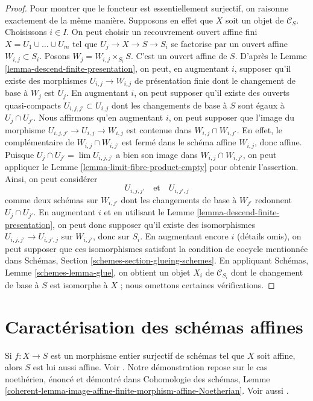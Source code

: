 \begin{proof}
\medskip\noindent
Pour montrer que le foncteur est essentiellement surjectif, on raisonne
exactement de la même manière. Supposons en effet que
$X$ soit un objet de $\mathcal{C}_S$. Choisissons $i \in I$.
On peut choisir un recouvrement ouvert affine fini
$X = U_1 \cup \ldots \cup U_m$ tel que $U_j \to X \to S \to S_i$
se factorise par un ouvert affine $W_{i, j} \subset S_i$.
Posons $W_j = W_{i, j} \times_{S_i} S$. C'est un ouvert affine de $S$.
D'après le Lemme \ref{lemma-descend-finite-presentation},
on peut, en augmentant $i$, supposer qu'il existe des morphismes
$U_{i, j} \to W_{i, j}$ de présentation finie
dont le changement de base à $W_j$ est $U_j$.
En augmentant $i$, on peut supposer qu'il existe
des ouverts quasi-compacts $U_{i, j, j'} \subset U_{i, j}$
dont les changements de base à $S$ sont égaux à $U_j \cap U_{j'}$.
Nous affirmons qu'en augmentant $i$, on peut supposer que l'image du morphisme
$U_{i, j, j'} \to U_{i, j} \to W_{i, j}$
est contenue dans $W_{i, j} \cap W_{i, j'}$.
En effet, le complémentaire de $W_{i, j} \cap W_{i, j'}$
est fermé dans le schéma affine $W_{i, j}$, donc affine.
Puisque $U_j \cap U_{j'} = \lim U_{i, j, j'}$ a bien son image dans
$W_{i, j} \cap W_{i, j'}$,
on peut appliquer le Lemme \ref{lemma-limit-fibre-product-empty}
pour obtenir l'assertion. Ainsi, on peut considérer
$$
U_{i, j, j'} \quad\text{et}\quad U_{i, j', j}
$$
comme deux schémas sur $W_{i, j'}$ dont les changements de base à $W_{j'}$
redonnent $U_j \cap U_{j'}$. En augmentant $i$ et en utilisant le
Lemme \ref{lemma-descend-finite-presentation},
on peut donc supposer qu'il existe des isomorphismes
$U_{i, j, j'} \to U_{i, j', j}$ sur $W_{i, j'}$, donc
sur $S_i$. En augmentant encore $i$ (détails omis),
on peut supposer que ces isomorphismes
satisfont la condition de cocycle mentionnée dans
Schémas, Section \ref{schemes-section-glueing-schemes}.
En appliquant Schémas, Lemme \ref{schemes-lemma-glue},
on obtient un objet $X_i$ de $\mathcal{C}_{S_i}$ dont le
changement de base à $S$ est isomorphe à $X$ ; nous omettons
certaines vérifications.
\end{proof}

\section{Caractérisation des schémas affines}
\label{section-affine}

\noindent
Si $f : X \to S$ est un morphisme entier surjectif de schémas
tel que $X$ soit affine, alors $S$ est lui aussi affine.
Voir \cite[A.2]{Conrad-Nagata}. Notre démonstration repose
sur le cas noethérien, énoncé et démontré dans Cohomologie des schémas,
Lemme \ref{coherent-lemma-image-affine-finite-morphism-affine-Noetherian}.
Voir aussi \cite[II 6.7.1]{EGA}.

